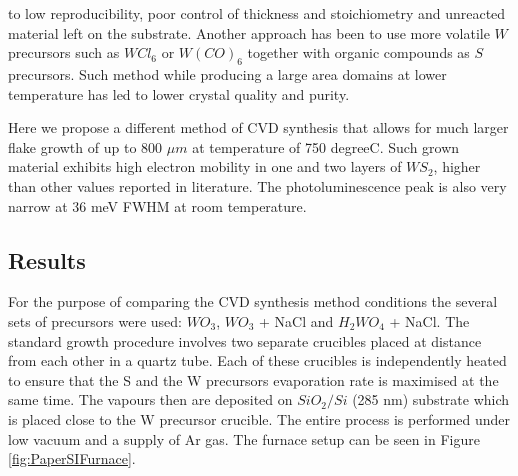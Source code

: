 \documentclass[12pt]{article}
\begin{document}
to low reproducibility, poor control of thickness and stoichiometry and unreacted material left on the substrate. Another approach has been to use more volatile $W$ precursors such as $WCl_6$\cite{Carmalt2003} or $W(CO)_6$\cite{Kang2015}\cite{Eichfeld2015} together with organic compounds as $S$ precursors. Such method while producing a large area domains at lower temperature has led to lower crystal quality and purity.

Here we propose a different method of CVD synthesis that allows for much larger flake growth of up to 800 $\mu m$ at temperature of 750 {degree}C. Such grown material exhibits high electron mobility in one and two layers of $WS_2$, higher than other values reported in literature. The photoluminescence peak is also very narrow at 36 meV FWHM at room temperature. 

	\subsection{Results}
	
For the purpose of comparing the CVD synthesis method conditions the several sets of precursors were used: $WO_3$, $WO_3$ + NaCl and $H_2WO_4$ + NaCl. The standard growth procedure involves two separate crucibles placed at distance from each other in a quartz tube. Each of these crucibles is independently heated to ensure that the S and the W precursors evaporation rate is maximised at the same time. The vapours then are deposited on $SiO_2/Si$ (285 nm) substrate which is placed close to the W precursor crucible. The entire process is performed under low vacuum and a supply of Ar gas. The furnace setup can be seen in Figure \ref{fig:PaperSIFurnace}.
\end{document}
